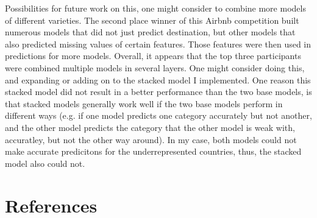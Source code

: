 \documentclass{article}
\begin{document}
Possibilities for future work on this, one might consider to combine more models of different varieties. 
The second place winner of this Airbnb competition built numerous models that did not just predict destination, 
but other models that also predicted missing values of certain features. Those features were then used in 
predictions for more models. Overall, it appears that the top three participants were combined multiple 
models in several layers. One might consider doing this, and expanding or adding on to the stacked model
I implemented. One reason this stacked model did not result in a better performance than the two base models, 
is that stacked models generally work well if the two base models perform in different ways (e.g. if one
model predicts one category accurately but not another, and the other model predicts the category that the 
other model is weak with, accuratley, but not the other way around). In my case, both models could not 
make accurate predicitons for the underrepresented countries, thus, the stacked model also could not. 


\section{References}
\end{document}
